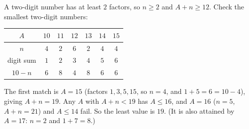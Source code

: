 A two-digit number has at least $2$ factors, so $n\ge2$ and $A+n\ge12$. Check the smallest two-digit numbers:
\begin{center}
\begin{tabular}{c|cccccc}
$A$ & $10$ & $11$ & $12$ & $13$ & $14$ & $15$\\ \hline
$n$ & $4$ & $2$ & $6$ & $2$ & $4$ & $4$\\
digit sum & $1$ & $2$ & $3$ & $4$ & $5$ & $6$\\
$10-n$ & $6$ & $8$ & $4$ & $8$ & $6$ & $6$
\end{tabular}
\end{center}
The first match is $A=15$ (factors $1,3,5,15$, so $n=4$, and $1+5=6=10-4$), giving $A+n=19$. Any $A$ with $A+n<19$ has $A\le16$, and $A=16$ ($n=5$, $A+n=21$) and $A\le14$ fail. So the least value is $\boxed{19}$. (It is also attained by $A=17$: $n=2$ and $1+7=8$.)
